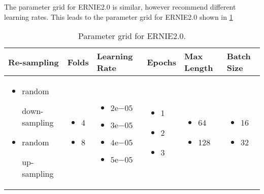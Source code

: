 The parameter grid for \ac{ERNIE2.0} is similar, however \textcite{Sun:2019a} recommend different learning rates.
This leads to the parameter grid for \ac{ERNIE2.0} shown in \cref{tab:study:execution:paramter_grid:ERNIE2.0}
\pagebreak %
\begin{table}[htpb]
    \centering
    \begin{tabular}{ p{3.5cm} p{1.5cm} p{2cm} p{1.5cm} p{1.6cm} p{1.5cm} }
        \toprule
         Re-sampling & Folds & Learning Rate & Epochs & Max Length & Batch Size \\
        \midrule
            \begin{itemize}[noitemsep,topsep=0pt,leftmargin=15pt]
                \item {random

                down-sampling}
                \item {random

                up-sampling}
            \end{itemize}
            &\begin{itemize}[noitemsep,topsep=0pt,leftmargin=15pt]
                \item 4
                \item 8
            \end{itemize}
            & \begin{itemize}[noitemsep,topsep=0pt,leftmargin=15pt]
                \item $2\mathrm{e}{-05}$
                \item $3\mathrm{e}{-05}$
                \item $4\mathrm{e}{-05}$
                \item $5\mathrm{e}{-05}$
            \end{itemize}
            & \begin{itemize}[noitemsep,topsep=0pt,leftmargin=15pt]
                \item 1
                \item 2
                \item 3
            \end{itemize}
            & \begin{itemize}[noitemsep,topsep=0pt,leftmargin=15pt]
                \item 64
                \item 128
            \end{itemize}
            & \begin{itemize}[noitemsep,topsep=0pt,leftmargin=15pt]
                \item 16
                \item 32
            \end{itemize}\\
        \bottomrule
    \end{tabular}
    \caption[Parameter Grid for \ac{ERNIE2.0}]{Parameter grid for \ac{ERNIE2.0}.}\label{tab:study:execution:paramter_grid:ERNIE2.0}
\end{table}

